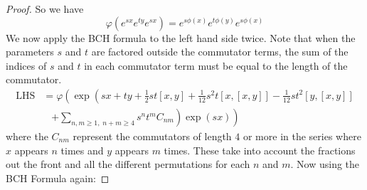 \documentclass[honours]{UNSWthesis}
\newcommand{\1}{\mathbf{e}_{1}}
\newcommand{\2}{\mathbf{e}_{3}}
\newcommand{\3}{\mathbf{e}_{3}}
\begin{document}
\begin{proof}

So we have 
\[
\varphi(e^{sx}e^{ty}e^{sx})= e^{s\phi(x)}e^{t\phi(y)}e^{s\phi(x)}
\]
We now apply the BCH formula to the left hand side twice. Note that when the parameters $s$ and $t$ are factored outside the commutator terms, the sum of the indices of $s$ and $t$ in each commutator term must be equal to the length of the commutator. 
\begin{align*}
\text{LHS} &= \varphi \left( \exp \left( 
sx+ty+\frac{1}{2}st[x, y]+\frac{1}{12}s^{2}t[x,[x,y]] -\frac{1}{12}st^{2}[y,[x,y]] \right. \right.\\
&\;\;\; \left. \left. +\sum\limits_{n,m \geq 1 ,\; n+m \geq 4} s^{n}t^{m}C_{nm}
\right) \exp (sx) \right) 
\end{align*}
where the $C_{nm}$ represent the commutators of length $4$ or more in the series where $x$ appears $n$ times and $y$ appears $m$ times. These take into account the fractions out the front and all the different permutations for each $n$ and $m$. Now using the BCH Formula again:


\end{proof}
\end{document}
